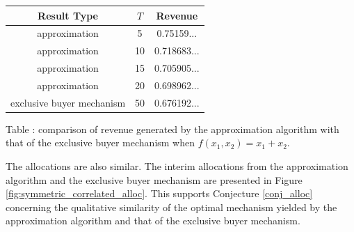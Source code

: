 \begin{center}
    \begin{tabular}{ |c|c|c| } 
    \hline
    Result Type & $T$ & Revenue \\
    \hline
    \hline
    approximation & 5 & 0.75159... \\ 
    approximation & 10 & 0.718683... \\ 
    approximation & 15 & 0.705905... \\ 
    approximation & 20 & 0.698962... \\ 
    exclusive buyer mechanism & 50 & 0.676192... \\
    \hline
    \end{tabular}

    \vspace{1mm}
    \raggedright{\small {\sc Table \thefig\label{table:symm_correlated_revenue}:} comparison of revenue generated by the approximation algorithm with that of the exclusive buyer mechanism when $f(x_1,x_2) = x_1 + x_2$.}
\end{center}

The allocations are also similar. The interim allocations from the approximation algorithm and the exclusive buyer mechanism are presented in Figure \ref{fig:symmetric_correlated_alloc}. This supports Conjecture \ref{conj_alloc} concerning the qualitative similarity of the optimal mechanism yielded by the approximation algorithm and that of the exclusive buyer mechanism.

